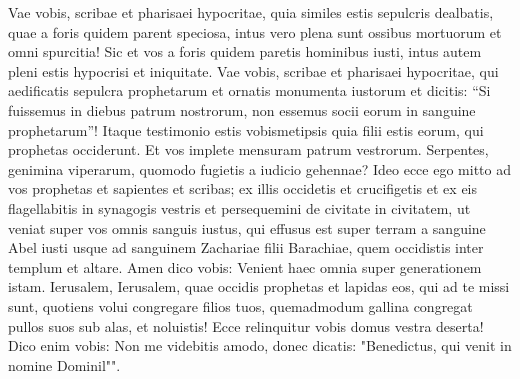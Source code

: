 \begin{biblechapter}
\verse Vae vobis, scribae et pharisaei hypocritae, quia similes estis sepulcris dealbatis, quae a foris quidem parent speciosa, intus vero plena sunt ossibus mortuorum et omni spurcitia! 
\verse Sic et vos a foris quidem paretis hominibus iusti, intus autem pleni estis hypocrisi et iniquitate. 
\verse Vae vobis, scribae et pharisaei hypocritae, qui aedificatis sepulcra prophetarum et ornatis monumenta iustorum 
\verse et dicitis: “Si fuissemus in diebus patrum nostrorum, non essemus socii eorum in sanguine prophetarum”!  
\verse Itaque testimonio estis vobismetipsis quia filii estis eorum, qui prophetas occiderunt. 
\verse Et vos implete mensuram patrum vestrorum. 
\verse Serpentes, genimina viperarum, quomodo fugietis a iudicio gehennae? 
\verse Ideo ecce ego mitto ad vos prophetas et sapientes et scribas; ex illis occidetis et crucifigetis et ex eis flagellabitis in synagogis vestris et persequemini de civitate in civitatem, 
\verse ut veniat super vos omnis sanguis iustus, qui effusus est super terram a sanguine Abel iusti usque ad sanguinem Zachariae filii Barachiae, quem occidistis inter templum et altare. 
\verse Amen dico vobis: Venient haec omnia super generationem istam. 
\verse Ierusalem, Ierusalem, quae occidis prophetas et lapidas eos, qui ad te missi sunt, quotiens volui congregare filios tuos, quemadmodum gallina congregat pullos suos sub alas, et noluistis! 
\verse Ecce relinquitur vobis domus vestra deserta! 
\verse Dico enim vobis: Non me videbitis amodo, donec dicatis: "Benedictus, qui venit in nomine Dominil"". 
\end{biblechapter}

